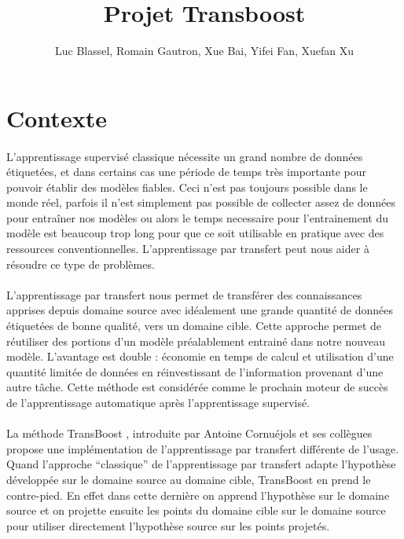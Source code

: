 \documentclass[11 pt]{article}
\title{Projet Transboost}
\author{Luc Blassel, Romain Gautron, Xue Bai, Yifei Fan, Xuefan Xu}
\begin{document}
\maketitle

\tableofcontents
\newpage

\section{Contexte}
\paragraph{}L’apprentissage supervisé  classique nécessite un grand nombre de données étiquetées, et dans certains cas une période de temps très importante pour pouvoir établir des modèles fiables. Ceci n’est pas toujours possible dans le monde réel, parfois il n’est simplement pas possible de collecter assez de données pour entraîner nos modèles ou alors le temps necessaire pour l’entrainement du modèle est beaucoup trop long pour que ce soit utilisable en pratique avec des ressources conventionnelles. L’apprentissage par transfert peut nous aider à résoudre ce type de problèmes.

\paragraph{}L’apprentissage par transfert nous permet de transférer des connaissances apprises depuis domaine source avec idéalement une grande quantité de données étiquetées de bonne qualité, vers un domaine cible. Cette approche permet de réutiliser des portions d’un modèle préalablement entrainé dans notre nouveau modèle. L'avantage est double : économie en temps de calcul et utilisation d'une quantité limitée de données en réinvestissant de l'information provenant d'une autre tâche. Cette méthode est considérée comme le prochain moteur de succès de l’apprentissage automatique après l’apprentissage supervisé.

\paragraph{}La méthode TransBoost \cite{transboost}, introduite par Antoine Cornuéjols et ses collègues propose une implémentation de l’apprentissage par transfert différente de l'usage. Quand l’approche “classique” de l’apprentissage par transfert adapte l'hypothèse développée sur le domaine source au domaine cible, TransBoost en prend le contre-pied. En effet dans cette dernière on apprend l'hypothèse sur le domaine source et on projette ensuite les points du domaine cible sur le domaine source pour utiliser directement l'hypothèse source sur les points projetés.
\end{document}
